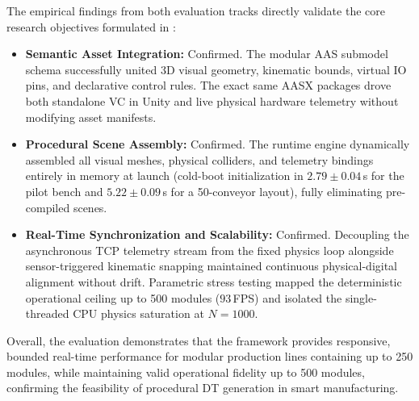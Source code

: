 The empirical findings from both evaluation tracks directly validate the core research objectives formulated in :

\begin{itemize}
    \item \textbf{Semantic Asset Integration:} Confirmed. The modular \gls{AAS} submodel schema successfully united 3D visual geometry, kinematic bounds, virtual \gls{IO} pins, and declarative control rules. The exact same \gls{AASX} packages drove both standalone \gls{VC} in Unity and live physical hardware telemetry without modifying asset manifests.
    \item \textbf{Procedural Scene Assembly:} Confirmed. The runtime engine dynamically assembled all visual meshes, physical colliders, and telemetry bindings entirely in memory at launch (cold-boot initialization in $2.79 \pm 0.04\,$s for the pilot bench and $5.22 \pm 0.09\,$s for a 50-conveyor layout), fully eliminating pre-compiled scenes.
    \item \textbf{Real-Time Synchronization and Scalability:} Confirmed. Decoupling the asynchronous \gls{TCP} telemetry stream from the fixed physics loop alongside sensor-triggered kinematic snapping maintained continuous physical-digital alignment without drift. Parametric stress testing mapped the deterministic operational ceiling up to 500 modules ($93\,$\gls{FPS}) and isolated the single-threaded \gls{CPU} physics saturation at $N=1000$.
\end{itemize}

Overall, the evaluation demonstrates that the framework provides responsive, bounded real-time performance for modular production lines containing up to 250 modules, while maintaining valid operational fidelity up to 500 modules, confirming the feasibility of procedural \gls{DT} generation in smart manufacturing.